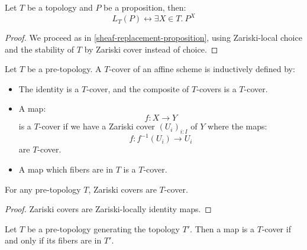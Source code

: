 \begin{lemma}\label{sheaf-proposition}
Let $T$ be a topology and $P$ be a proposition, then:
\[L_T(P)\leftrightarrow \exists X\in T.\ P^X\]
\end{lemma}

\begin{proof}
We proceed as in \cref{sheaf-replacement-proposition}, using Zariski-local choice and the stability of $T$ by Zariski cover instead of choice.
\end{proof}

\begin{definition}
Let $T$ be a pre-topology. A $T$-cover of an affine scheme is inductively defined by:
\begin{itemize}
\item The identity is a $T$-cover, and the composite of $T$-covers is a $T$-cover.
\item A map:
\[f:X\to Y\] 
is a $T$-cover if we have a Zariski cover $(U_i)_{i:I}$ of $Y$ where the maps:
\[f:f^{-1}(U_i) \to U_i\]
are $T$-cover.
\item A map which fibers are in $T$ is a $T$-cover.
\end{itemize}
\end{definition}

\begin{lemma}\label{zariski-cover-are-cover}
For any pre-topology $T$, Zariski covers are $T$-cover.
\end{lemma}

\begin{proof}
Zariski covers are Zariski-locally identity maps.
\end{proof}

\begin{lemma}\label{cover-can-be-defined-pointwise}
Let $T$ be a pre-topology generating the topology $T'$. Then a map is a $T$-cover if and only if its fibers are in $T'$.
\end{lemma}

